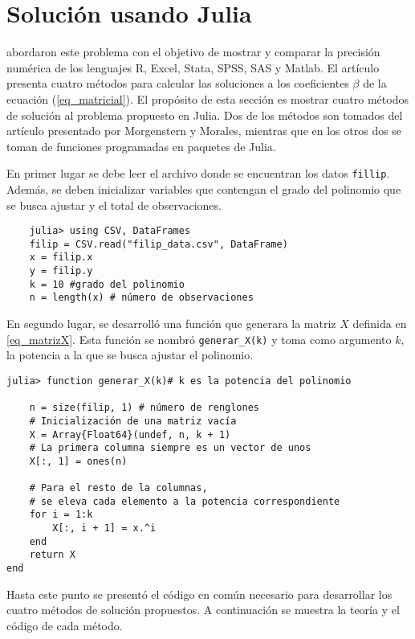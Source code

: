 \section{Solución usando Julia}

\cite{laberintos} abordaron este problema con el objetivo de mostrar y comparar la precisión numérica de los lenguajes \textsf{R, Excel, Stata, SPSS, SAS} y \textsf{Matlab}. El artículo presenta cuatro métodos para calcular las soluciones a los coeficientes $\beta$ de la ecuación (\ref{eq_matricial}). El propósito de esta sección es mostrar cuatro métodos de solución al problema propuesto en \textsf{Julia}. Dos de los métodos son tomados del artículo presentado por Morgenstern y Morales, mientras que en los otros dos se toman de funciones programadas en paquetes de \textsf{Julia}. 

En primer lugar se debe leer el archivo donde se encuentran los datos \texttt{fillip}. Además, se deben inicializar variables que contengan el grado del polinomio que se busca ajustar y el total de observaciones. 

\begin{verbatim}
    julia> using CSV, DataFrames
    filip = CSV.read("filip_data.csv", DataFrame)
    x = filip.x
    y = filip.y
    k = 10 #grado del polinomio
    n = length(x) # número de observaciones
\end{verbatim}

En segundo lugar, se desarrolló una función que generara la matriz $X$ definida en \ref{eq_matrizX}. Esta función se nombró \texttt{generar\_X(k)} y toma como argumento $k$, la potencia a la que se busca ajustar el polinomio. 


\begin{verbatim}
julia> function generar_X(k)# k es la potencia del polinomio

    n = size(filip, 1) # número de renglones
    # Inicialización de una matriz vacía
    X = Array{Float64}(undef, n, k + 1)
    # La primera columna siempre es un vector de unos
    X[:, 1] = ones(n)
    
    # Para el resto de la columnas,
    # se eleva cada elemento a la potencia correspondiente
    for i = 1:k
        X[:, i + 1] = x.^i
    end
    return X
end
\end{verbatim}

Hasta este punto se presentó el código en común necesario para desarrollar los cuatro métodos de solución propuestos. A continuación se muestra la teoría y el código de cada método. 

